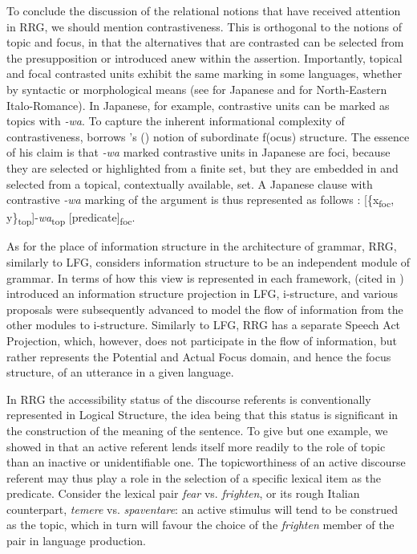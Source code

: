 \documentclass[output=paper,hidelinks]{langscibook}
\begin{document}
  To conclude the discussion of the relational notions that have received attention in RRG, we should mention contrastiveness. This is orthogonal to the notions of topic and focus, in that the alternatives that are contrasted can be selected from the presupposition or introduced anew within the assertion. Importantly, topical and focal contrasted units exhibit the same marking in some languages, whether by syntactic or morphological means (see \citealt{Shimojo2009,Shimojo2010,Shimojo2011} for Japanese and \citealt{DeCia2019} for North-Eastern Italo-Romance). In Japanese, for example, contrastive units can be marked as topics with \textit{-wa}. To capture the inherent informational complexity of contrastiveness, \citet{Shimojo2011} borrows  \citeauthor{Erteschik1997}'s (\citeyear{Erteschik1997,Erteschik-Shir2007}) notion of subordinate f(ocus) structure. The essence of his claim is that \textit{-wa} marked contrastive units in Japanese are foci, because they are selected or highlighted from a finite set, but they are embedded in and selected from a topical, contextually available, set. A Japanese clause with contrastive \textit{-wa} marking of the argument is thus represented as follows \citep[275]{Shimojo2011}: [\{x\textsubscript{foc}, y\}\textsubscript{top}]-\textit{wa}\textsubscript{top} [predicate]\textsubscript{foc}.

  As for the place of information structure in the architecture of grammar, RRG, similarly to LFG, considers information structure to be an independent module of grammar. In terms of how this view is represented in each framework, \citet{King1997} (cited in ) introduced an information structure projection in LFG, i-structure, and various proposals were subsequently advanced to model the flow of information from the other modules to i-structure. Similarly to LFG, RRG has a separate Speech Act Projection, which, however, does not participate in the flow of information, but rather represents the Potential and Actual Focus domain, and hence the focus structure, of an utterance in a given language.

  In RRG the accessibility status of the discourse referents is conventionally represented in Logical Structure, the idea being that this status is significant in the construction of the meaning of the sentence. To give but one example, we showed in  that an active referent lends itself more readily to the role of topic than an inactive or unidentifiable one. The topicworthiness of an active discourse referent may thus play a role in the selection of a specific lexical item as the predicate. Consider the lexical pair \textit{fear} vs. \textit{frighten}, or its rough Italian counterpart, \textit{temere} vs. \textit{spaventare}: an active stimulus will tend to be construed as the topic, which in turn will favour the choice of the \textit{frighten} member of the pair in language production.
\end{document}

